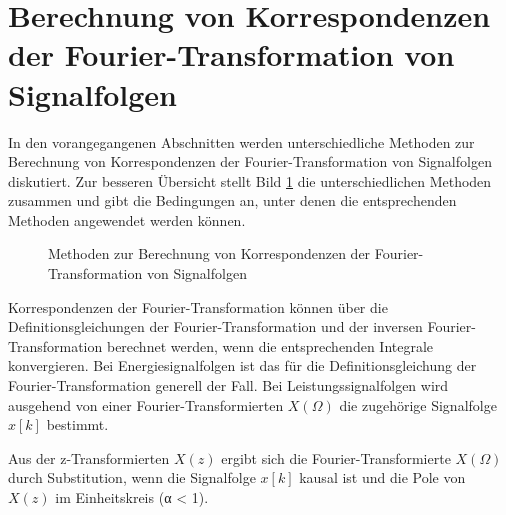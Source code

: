\section{Berechnung von Korrespondenzen der Fourier-Transformation von Signalfolgen}\label{sec:7.4}

In den vorangegangenen Abschnitten werden unterschiedliche Methoden zur Berechnung von Korrespondenzen der Fourier-Transformation von Signalfolgen diskutiert. Zur besseren Übersicht stellt Bild \ref{fig:7.21} die unterschiedlichen Methoden zusammen und gibt die Bedingungen an, unter denen die entsprechenden Methoden angewendet werden können.

\begin{figure}
  \centering
  
  \caption{Methoden zur Berechnung von Korrespondenzen der Fourier-Transformation von Signalfolgen}
  \label{fig:7.21}
\end{figure}

Korrespondenzen der Fourier-Transformation können über die Definitionsgleichungen der Fourier-Transformation und der inversen Fourier-Transformation berechnet werden, wenn die entsprechenden Integrale konvergieren. Bei Energiesignalfolgen ist das für die Definitionsgleichung der Fourier-Transformation generell der Fall. Bei Leistungssignalfolgen wird ausgehend von einer Fourier-Transformierten \(X(Ω)\) die zugehörige Signalfolge \(x[k]\) bestimmt.

Aus der z-Transformierten \(X(z)\) ergibt sich die Fourier-Transformierte \(X(Ω)\) durch Substitution, wenn die Signalfolge \(x[k]\) kausal ist und die Pole von \(X(z)\) im Einheitskreis (\textbar α\textbar{} \textless{} 1).
